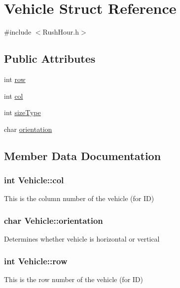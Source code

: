 \hypertarget{struct_vehicle}{}\section{Vehicle Struct Reference}
\label{struct_vehicle}


{\ttfamily \#include $<$Rush\+Hour.\+h$>$}

\subsection*{Public Attributes}
\begin{DoxyCompactItemize}
\item 
int \hyperlink{struct_vehicle_ac1e8cf25e4fe9d89e629bb40664eebf2}{row}
\item 
int \hyperlink{struct_vehicle_acdd8fd901fcea30a84887f82eaeb1c7a}{col}
\item 
int \hyperlink{struct_vehicle_a79b518cc24d1483c305d3b7e67a621ab}{size\+Type}
\item 
char \hyperlink{struct_vehicle_a038ab3eb71ac1ef14408c74f4fbf3d27}{orientation}
\end{DoxyCompactItemize}


\subsection{Member Data Documentation}
\subsubsection[{\texorpdfstring{col}{col}}]{\setlength{\rightskip}{0pt plus 5cm}int Vehicle\+::col}\hypertarget{struct_vehicle_acdd8fd901fcea30a84887f82eaeb1c7a}{}\label{struct_vehicle_acdd8fd901fcea30a84887f82eaeb1c7a}
This is the column number of the vehicle (for ID) 
\subsubsection[{\texorpdfstring{orientation}{orientation}}]{\setlength{\rightskip}{0pt plus 5cm}char Vehicle\+::orientation}\hypertarget{struct_vehicle_a038ab3eb71ac1ef14408c74f4fbf3d27}{}\label{struct_vehicle_a038ab3eb71ac1ef14408c74f4fbf3d27}
Determines whether vehicle is horizontal or vertical 
\subsubsection[{\texorpdfstring{row}{row}}]{\setlength{\rightskip}{0pt plus 5cm}int Vehicle\+::row}\hypertarget{struct_vehicle_ac1e8cf25e4fe9d89e629bb40664eebf2}{}\label{struct_vehicle_ac1e8cf25e4fe9d89e629bb40664eebf2}
This is the row number of the vehicle (for ID) 
